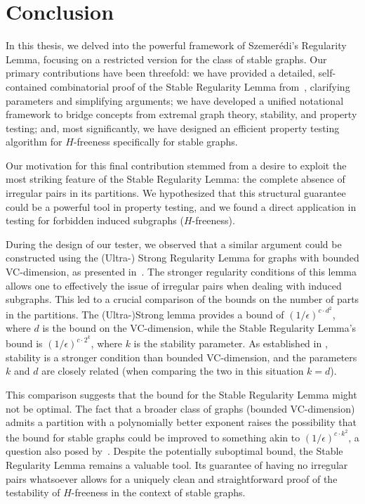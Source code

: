 \section{Conclusion} \label{sec:conclusion}
    In this thesis, we delved into the powerful framework of Szemerédi's Regularity Lemma,
    focusing on a restricted version for the class of stable graphs.
    Our primary contributions have been threefold: we have provided a detailed, self-contained combinatorial proof of the Stable
    Regularity Lemma from~\cite{regularity_lemmas_for_stable_graphs}, clarifying parameters and simplifying arguments;
    we have developed a unified notational framework to bridge concepts from extremal graph theory, stability,
    and property testing; and, most significantly, we have designed an efficient property testing algorithm for
    $H$-freeness specifically for stable graphs.

    Our motivation for this final contribution stemmed from a desire to exploit the most striking feature of the Stable
    Regularity Lemma: the complete absence of irregular pairs in its partitions.
    We hypothesized that this structural guarantee could be a powerful tool in property testing, and we found a
    direct application in testing for forbidden induced subgraphs ($H$-freeness).

    During the design of our tester, we observed that a similar argument could be constructed using the
    (Ultra-) Strong Regularity Lemma for graphs with bounded VC-dimension, as presented
    in~\cite{regularity_partitions_and_the_topology_of_graphons}.
    The stronger regularity conditions of this lemma allows one to effectively  the issue of irregular
    pairs when dealing with induced subgraphs.
    This led to a crucial comparison of the bounds on the number of parts in the partitions.
    The (Ultra-)Strong lemma provides a bound of $(1/\epsilon)^{c \cdot d^2}$, where $d$ is the bound on the VC-dimension,
    while the Stable Regularity Lemma's bound is $(1/\epsilon)^{c \cdot 2^k}$, where $k$ is the stability parameter.
    As established in , stability is a stronger condition than bounded VC-dimension,
    and the parameters $k$ and $d$ are closely related (when comparing the two in this situation $k=d$).

    This comparison suggests that the bound for the Stable Regularity Lemma might not be optimal.
    The fact that a broader class of graphs (bounded VC-dimension) admits a partition with a polynomially better
    exponent raises the possibility that the bound for stable graphs could be improved to something akin to
    $(1/\epsilon)^{c \cdot k^2}$, a question also posed by~\cite{julia_wolf_private_comunication}.
    Despite the potentially suboptimal bound, the Stable Regularity Lemma remains a valuable tool.
    Its guarantee of having no irregular pairs whatsoever allows for a uniquely clean and straightforward
    proof of the testability of $H$-freeness in the context of stable graphs.

